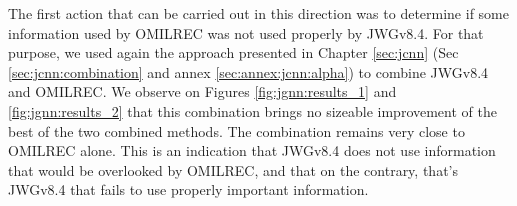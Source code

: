 \documentclass[../main.tex]{subfiles}
\begin{document}
The first action that can be carried out in this direction was to determine if some information used by OMILREC was not used properly by JWGv8.4. For that purpose, we used again the approach presented in Chapter \ref{sec:jcnn} (Sec \ref{sec:jcnn:combination} and annex \ref{sec:annex:jcnn:alpha}) to combine JWGv8.4 and OMILREC. We observe on Figures \ref{fig:jgnn:results_1} and \ref{fig:jgnn:results_2} that this combination brings no sizeable improvement  of the best of the two combined methods. The combination remains very close to OMILREC alone. This is an indication that JWGv8.4 does not use information that would be overlooked by OMILREC, and that on the contrary, that's JWGv8.4 that fails to use properly important information.

%
%
\end{document}
